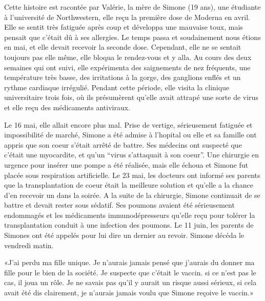 Cette histoire est racontée par Valérie, la mère de Simone (19 ans), une
étudiante à l'université de Northwestern, elle reçu la première dose de Moderna
en avril. Elle se sentit très fatiguée après coup et développa une mauvaise
toux, mais pensait que c'était dû à ses allergies. Le temps passa et
soudainement nous étions en mai, et elle devait recevoir la seconde
dose. Cependant, elle ne se sentait toujours pas elle même, elle bloqua le
rendez-vous et y alla. Au cours des deux semaines qui ont suivi, elle
expérimenta des saignements de nez fréquents, une température très basse, des
irritations à la gorge, des ganglions enflés et un rythme cardiaque
irrégulié. Pendant cette période, elle visita la clinique universitaire trois
fois, où ils présumèrent qu'elle avait attrapé une sorte de virus et elle reçu
des médicaments antiviraux.

Le 16 mai, elle allait encore plus mal. Prise de vertige, sérieusement fatiguée
et impossibilité de marché, Simone a été admise à l'hopital ou elle et sa
famille ont appris que son coeur s'était arrêté de battre. Ses médecins ont
suspecté que c'était une myocardite, et qu'un “virus s'attaquait à son
coeur”. Une chirurgie en urgence pour insérer une pompe a été réalisée, mais
elle échoua et Simone fut placée sous respiration artificielle. Le 23 mai, les
docteurs ont informé ses parents que la transplantation de coeur était la
meilleure solution et qu'elle a la chance d'en recevoir un dans la soirée. A la
suite de la chirurgie, Simone continuait de se battre et devait rester sous
sédatif. Ses poumons avaient été sérieusement endommagés et les médicaments
immunodépresseurs qu'elle reçu pour tolérer la transplantation conduit à une
infection des poumons. Le 11 juin, les parents de Simones ont été appelés pour
lui dire un dernier au revoir. Simone décéda le vendredi matin.

«J'ai perdu ma fille unique. Je n'aurais jamais pensé que j'aurais du donner ma
fille pour le bien de la société. Je suspecte que c'était le vaccin. si ce n'est
pas le cas, il joua un rôle. Je ne savais pas qu'il y aurait un risque aussi
sérieux, si cela avait été dis clairement, je n'aurais jamais voulu que Simone
reçoive le vaccin.»

